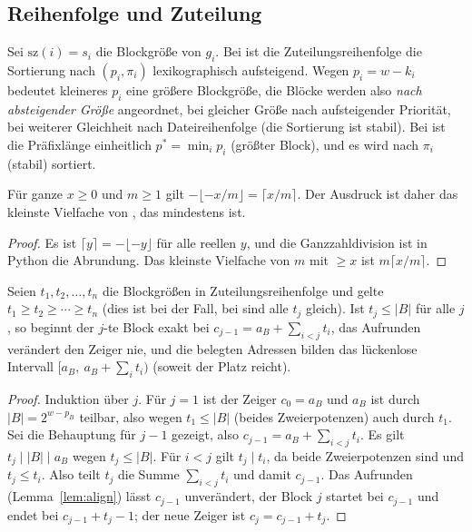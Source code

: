 \subsection{Reihenfolge und Zuteilung}

Sei $\mathrm{sz}(i) = s_i$ die Blockgröße von $g_i$. Bei  ist die Zuteilungsreihenfolge die Sortierung nach $(p_i,\pi_i)$ lexikographisch aufsteigend. Wegen $p_i = w - k_i$ bedeutet kleineres $p_i$ eine größere Blockgröße, die Blöcke werden also \emph{nach absteigender Größe} angeordnet, bei gleicher Größe nach aufsteigender Priorität, bei weiterer Gleichheit nach Dateireihenfolge (die Sortierung ist stabil). Bei  ist die Präfixlänge einheitlich $p^* = \min_i p_i$ (größter Block), und es wird nach $\pi_i$ (stabil) sortiert.

\begin{lemma}
\label{lem:align}
	Für ganze $x \ge 0$ und $m \ge 1$ gilt $-\lfloor -x/m \rfloor = \lceil x/m\rceil$. Der Ausdruck  ist daher das kleinste Vielfache von , das mindestens  ist.
\end{lemma}

\begin{proof}
	Es ist $\lceil y \rceil = -\lfloor -y\rfloor$ für alle reellen $y$, und die Ganzzahldivision \code{//} ist in Python die Abrundung. Das kleinste Vielfache von $m$ mit $\ge x$ ist $m\lceil x/m\rceil$.
\end{proof}

\begin{satz}[Lückenlosigkeit]
\label{satz:luecke}
	Seien $t_1, t_2, \ldots, t_n$ die Blockgrößen in Zuteilungsreihenfolge und gelte $t_1 \ge t_2 \ge \cdots \ge t_n$ (dies ist bei  der Fall, bei  sind alle $t_j$ gleich). Ist $t_j \le |B|$ für alle $j$, so beginnt der $j$-te Block exakt bei $c_{j-1} = a_B + \sum_{i<j} t_i$, das Aufrunden verändert den Zeiger nie, und die belegten Adressen bilden das lückenlose Intervall $[a_B,\ a_B + \sum_i t_i)$ (soweit der Platz reicht).
\end{satz}

\begin{proof}
	Induktion über $j$. Für $j=1$ ist der Zeiger $c_0 = a_B$ und $a_B$ ist durch $|B| = 2^{w-p_B}$ teilbar, also wegen $t_1 \le |B|$ (beides Zweierpotenzen) auch durch $t_1$. Sei die Behauptung für $j-1$ gezeigt, also $c_{j-1} = a_B + \sum_{i<j} t_i$. Es gilt $t_j \mid |B| \mid a_B$ wegen $t_j \le |B|$. Für $i < j$ gilt $t_j \mid t_i$, da beide Zweierpotenzen sind und $t_j \le t_i$. Also teilt $t_j$ die Summe $\sum_{i<j}t_i$ und damit $c_{j-1}$. Das Aufrunden (Lemma~\ref{lem:align}) lässt $c_{j-1}$ unverändert, der Block $j$ startet bei $c_{j-1}$ und endet bei $c_{j-1}+t_j - 1$; der neue Zeiger ist $c_j = c_{j-1} + t_j$.
\end{proof}

